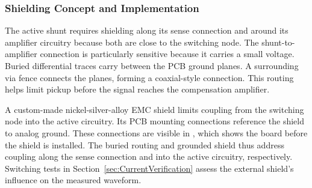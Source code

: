 \FloatBarrier

\subsubsection*{Shielding Concept and Implementation}
The active shunt requires shielding along its sense connection and around its amplifier circuitry because both are close to the switching node.
The shunt-to-amplifier connection is particularly sensitive because it carries a small voltage.
Buried differential traces carry  between the PCB ground planes.
A surrounding via fence connects the planes, forming a coaxial-style connection.
This routing helps limit pickup before the signal reaches the compensation amplifier.

A custom-made nickel-silver-alloy EMC shield limits coupling from the switching node into the active circuitry.
Its PCB mounting connections reference the shield to analog ground.
These connections are visible in , which shows the board before the shield is installed.
The buried routing and grounded shield thus address coupling along the sense connection and into the active circuitry, respectively.
Switching tests in Section~\ref{sec:CurrentVerification} assess the external shield's influence on the measured waveform.